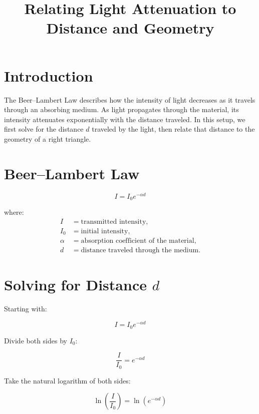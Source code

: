 \documentclass{article}
\begin{document}
\title{Relating Light Attenuation to Distance and Geometry}
\author{}
\date{}
\maketitle

\section*{Introduction}

The Beer--Lambert Law describes how the intensity of light decreases as it travels through an absorbing medium. As light propagates through the material, its intensity attenuates exponentially with the distance traveled. In this setup, we first solve for the distance \(d\) traveled by the light, then relate that distance to the geometry of a right triangle.

\section*{Beer--Lambert Law}

\begin{equation}
I = I_0 e^{-\alpha d}
\end{equation}

where:
\begin{align*}
I   &= \text{transmitted intensity}, \\
I_0 &= \text{initial intensity}, \\
\alpha &= \text{absorption coefficient of the material}, \\
d   &= \text{distance traveled through the medium}.
\end{align*}

\section*{Solving for Distance \(d\)}

Starting with:

\begin{equation}
I = I_0 e^{-\alpha d}
\end{equation}

Divide both sides by \(I_0\):

\begin{equation}
\frac{I}{I_0} = e^{-\alpha d}
\end{equation}

Take the natural logarithm of both sides:

\begin{equation}
\ln\left(\frac{I}{I_0}\right) = \ln\left(e^{-\alpha d}\right)
\end{equation}
\end{document}
